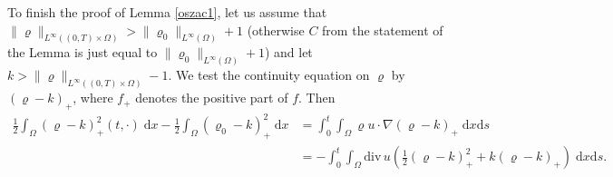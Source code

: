 \documentclass[11pt]{article}
\newcommand{\dd}{\mathrm{d}}
\newcommand{\ddiv}{\mathrm{div\,}}
\numberwithin{equation}{section}
\numberwithin{tw}{section}
\begin{document}
 

\smallskip 

To finish the proof of Lemma \ref{oszac1}, let us assume that $\|\varrho\|_{L^\infty((0,T)\times\Omega)}>\|\varrho_0\|_{L^\infty(\Omega)}+1$ (otherwise $C$ from the statement of the Lemma is just equal to $\|\varrho_0\|_{L^\infty(\Omega)}+1$) and let $k>\|\varrho\|_{L^\infty((0,T)\times\Omega)}-1$. We test the continuity equation on $\varrho$ by $(\varrho-k)_+$, where $f_+$ denotes the positive part of $f$. Then 
\[\begin{aligned} \frac{1}{2}\int_\Omega (\varrho-k)_+^2(t,\cdot)\;\dd x - \frac{1}{2}\int_\Omega (\varrho_0-k)_+^2\;\dd x &=  \int_0^t\int_\Omega \varrho u\cdot\nabla(\varrho-k)_+\;\dd x\dd s \\
&= -\int_0^t\int_\Omega \ddiv u\left(\frac{1}{2}(\varrho-k)_+^2 + k(\varrho-k)_+\right)\;\dd x\dd s.
\end{aligned}\]
\end{document}
